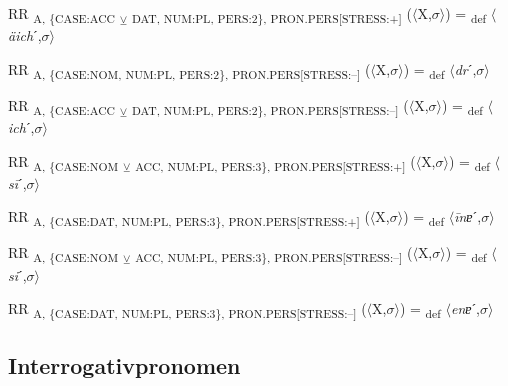 {\begin{exe}
 RR \textsubscript{A, \{CASE:ACC} \textsubscript{${\veebar}$}\textsubscript{ DAT, NUM:PL, PERS:2\}, PRON.PERS[STRESS:+]} ($\langle$X,$\sigma $$\rangle$) = \textsubscript{def} $\langle$\textit{äich}ˊ,$\sigma $$\rangle$
\end{exe}

\begin{exe}
 RR \textsubscript{A, \{CASE:NOM, NUM:PL, PERS:2\}, PRON.PERS[STRESS:–]} ($\langle$X,$\sigma $$\rangle$) = \textsubscript{def} $\langle$\textit{dr}ˊ,$\sigma $$\rangle$
\end{exe}

\begin{exe}
 RR \textsubscript{A, \{CASE:ACC} \textsubscript{${\veebar}$}\textsubscript{ DAT, NUM:PL, PERS:2\}, PRON.PERS[STRESS:–]} ($\langle$X,$\sigma $$\rangle$) = \textsubscript{def} $\langle$\textit{ich}ˊ,$\sigma $$\rangle$
\end{exe}

\begin{exe}
 RR \textsubscript{A, \{CASE:NOM} \textsubscript{${\veebar}$}\textsubscript{ ACC, NUM:PL, PERS:3\}, PRON.PERS[STRESS:+]} ($\langle$X,$\sigma $$\rangle$) = \textsubscript{def} $\langle$\textit{s\=i}ˊ,$\sigma $$\rangle$
\end{exe}

\begin{exe}
 RR \textsubscript{A, \{CASE:DAT, NUM:PL, PERS:3\}, PRON.PERS[STRESS:+]} ($\langle$X,$\sigma $$\rangle$) = \textsubscript{def} $\langle$\textit{\=inɐ}ˊ,$\sigma $$\rangle$
\end{exe}

\begin{exe}
 RR \textsubscript{A, \{CASE:NOM} \textsubscript{${\veebar}$}\textsubscript{ ACC, NUM:PL, PERS:3\}, PRON.PERS[STRESS:–]} ($\langle$X,$\sigma $$\rangle$) = \textsubscript{def} $\langle$\textit{si}ˊ,$\sigma $$\rangle$
\end{exe}

\begin{exe}
 RR \textsubscript{A, \{CASE:DAT, NUM:PL, PERS:3\}, PRON.PERS[STRESS:–]} ($\langle$X,$\sigma $$\rangle$) = \textsubscript{def} $\langle$\textit{enɐ}ˊ,$\sigma $$\rangle$
\end{exe}

\subsection{Interrogativpronomen}

}
